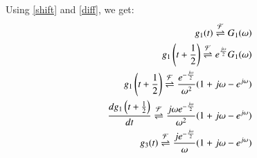\documentclass[journal,12pt,twocolumn]{IEEEtran}
\begin{document}
Using \eqref{shift} and \eqref{diff}, we get:
\begin{align}
    g_1(t) \overset{\mathcal{F}}{ \rightleftharpoons} G_1(\omega)\\
    g_1\left(t + \frac{1}{2}\right)\overset{\mathcal{F}}{ \rightleftharpoons} e^{\frac{j\omega}{2}}G_1(\omega) \\g_1\left(t + \frac{1}{2}\right)\overset{\mathcal{F}}{ \rightleftharpoons}\frac{e^{-\frac{j\omega}{2}}}{\omega^2}(1 + j\omega  - e^{j\omega})\\
    \frac{dg_1\left(t + \frac{1}{2}\right)}{dt} \overset{\mathcal{F}}{ \rightleftharpoons} \frac{j\omega e^{-\frac{j\omega}{2}}}{\omega^2}(1 + j\omega  - e^{j\omega})\\
    g_3(t) \overset{\mathcal{F}}{ \rightleftharpoons} \frac{j e^{-\frac{j\omega}{2}}}{\omega}(1 + j\omega  - e^{j\omega})
\end{align}
\end{document}
